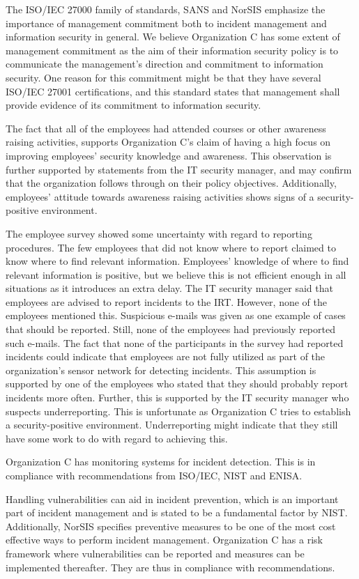 The ISO/IEC 27000 family of standards, SANS and NorSIS emphasize the importance of management commitment both to incident management and information security in general. We believe Organization C has some extent of management commitment as the aim of their information security policy is to communicate the management's direction and commitment to information security. One reason for this commitment might be that they have several ISO/IEC 27001 certifications, and this standard states that management shall provide evidence of its commitment to information security. 

The fact that all of the employees had attended courses or other awareness raising activities, supports Organization C's claim of having a high focus on improving employees' security knowledge and awareness. This observation is further supported by statements from the IT security manager, and may confirm that the organization follows through on their policy objectives. Additionally, employees' attitude towards awareness raising activities shows signs of a security-positive environment.  
 
The employee survey showed some uncertainty with regard to reporting procedures. The few employees that did not know where to report claimed to know where to find relevant information. Employees' knowledge of where to find relevant information is positive, but we believe this is not efficient enough in all situations as it introduces an extra delay. The IT security manager said that employees are advised to report incidents to the \ac{IRT}. However, none of the employees mentioned this. Suspicious e-mails was given as one example of cases that should be reported. Still, none of the employees had previously reported such e-mails. The fact that none of the participants in the survey had reported incidents could indicate that employees are not fully utilized as part of the organization's sensor network for detecting incidents. This assumption is supported by one of the employees who stated that they should probably report incidents more often. Further, this is supported by the IT security manager who suspects underreporting. This is unfortunate as Organization C tries to establish a security-positive environment. Underreporting might indicate that they still have some work to do with regard to achieving this. 

Organization C has monitoring systems for incident detection. This is in compliance with recommendations from ISO/IEC, NIST and ENISA. 

Handling vulnerabilities can aid in incident prevention, which is an important part of incident management and is stated to be a fundamental factor by NIST. Additionally, NorSIS specifies preventive measures to be one of the most cost effective ways to perform incident management. Organization C has a risk framework where vulnerabilities can be reported and measures can be implemented thereafter. They are thus in compliance with recommendations.

